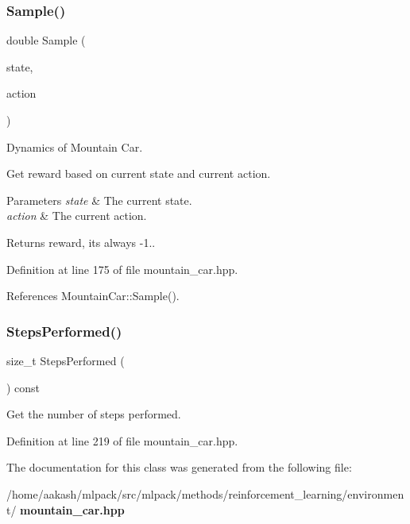 \mbox{\label{classmlpack_1_1rl_1_1MountainCar_af2bb860eaefeaa62a40f5cf940793704}} 
\subsubsection{Sample()\hspace{0.1cm}{\footnotesize\ttfamily [2/2]}}
{\footnotesize\ttfamily double Sample (\begin{DoxyParamCaption}\item[{const \textbf{ State} \&}]{state,  }\item[{const \textbf{ Action} \&}]{action }\end{DoxyParamCaption})\hspace{0.3cm}{\ttfamily [inline]}}



Dynamics of Mountain Car. 

Get reward based on current state and current action.


\begin{DoxyParams}{Parameters}
{\em state} & The current state. \\
\hline
{\em action} & The current action. \\
\hline
\end{DoxyParams}
\begin{DoxyReturn}{Returns}
reward, it\textquotesingle{}s always -\/1.. 
\end{DoxyReturn}


Definition at line 175 of file mountain\+\_\+car.\+hpp.



References Mountain\+Car\+::\+Sample().

\mbox{\label{classmlpack_1_1rl_1_1MountainCar_a5fe06563064ebcee88c593e1673f03d4}} 
\subsubsection{Steps\+Performed()}
{\footnotesize\ttfamily size\+\_\+t Steps\+Performed (\begin{DoxyParamCaption}{ }\end{DoxyParamCaption}) const\hspace{0.3cm}{\ttfamily [inline]}}



Get the number of steps performed. 



Definition at line 219 of file mountain\+\_\+car.\+hpp.



The documentation for this class was generated from the following file\+:\begin{DoxyCompactItemize}
\item 
/home/aakash/mlpack/src/mlpack/methods/reinforcement\+\_\+learning/environment/\textbf{ mountain\+\_\+car.\+hpp}\end{DoxyCompactItemize}
